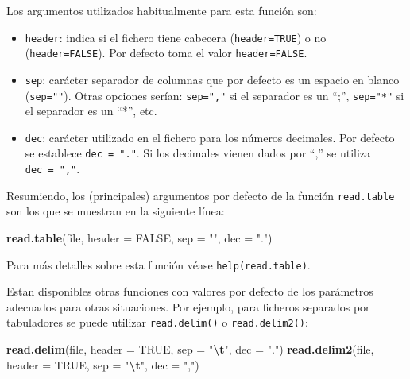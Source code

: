 \documentclass[
]{book}
\newenvironment{Shaded}{\begin{snugshade}}{\end{snugshade}}
\newcommand{\AttributeTok}[1]{\textcolor[rgb]{0.13,0.29,0.53}{#1}}
\newcommand{\ConstantTok}[1]{\textcolor[rgb]{0.56,0.35,0.01}{#1}}
\newcommand{\FunctionTok}[1]{\textcolor[rgb]{0.13,0.29,0.53}{\textbf{#1}}}
\newcommand{\NormalTok}[1]{#1}
\newcommand{\SpecialCharTok}[1]{\textcolor[rgb]{0.81,0.36,0.00}{\textbf{#1}}}
\newcommand{\StringTok}[1]{\textcolor[rgb]{0.31,0.60,0.02}{#1}}
\begin{document}
Los argumentos utilizados habitualmente para esta función son:

\begin{itemize}
\item
  \texttt{header}: indica si el fichero tiene cabecera (\texttt{header=TRUE}) o no
  (\texttt{header=FALSE}). Por defecto toma el valor \texttt{header=FALSE}.
\item
  \texttt{sep}: carácter separador de columnas que por defecto es un espacio
  en blanco (\texttt{sep=""}). Otras opciones serían: \texttt{sep=","} si el separador es
  un ``;'', \texttt{sep="*"} si el separador es un ``*'', etc.
\item
  \texttt{dec}: carácter utilizado en el fichero para los números decimales.
  Por defecto se establece \texttt{dec\ =\ "."}. Si los decimales vienen dados
  por ``,'' se utiliza \texttt{dec\ =\ ","}.
\end{itemize}

Resumiendo, los (principales) argumentos por defecto de la función
\texttt{read.table} son los que se muestran en la siguiente línea:

\begin{Shaded}
\begin{Highlighting}[]
\FunctionTok{read.table}\NormalTok{(file, }\AttributeTok{header =} \ConstantTok{FALSE}\NormalTok{, }\AttributeTok{sep =} \StringTok{""}\NormalTok{, }\AttributeTok{dec =} \StringTok{"."}\NormalTok{)  }
\end{Highlighting}
\end{Shaded}

Para más detalles sobre esta función véase
\texttt{help(read.table)}.

Estan disponibles otras funciones con valores por defecto de los parámetros
adecuados para otras situaciones. Por ejemplo, para ficheros separados por tabuladores
se puede utilizar \texttt{read.delim()} o \texttt{read.delim2()}:

\begin{Shaded}
\begin{Highlighting}[]
\FunctionTok{read.delim}\NormalTok{(file, }\AttributeTok{header =} \ConstantTok{TRUE}\NormalTok{, }\AttributeTok{sep =} \StringTok{"}\SpecialCharTok{\textbackslash{}t}\StringTok{"}\NormalTok{, }\AttributeTok{dec =} \StringTok{"."}\NormalTok{)}
\FunctionTok{read.delim2}\NormalTok{(file, }\AttributeTok{header =} \ConstantTok{TRUE}\NormalTok{, }\AttributeTok{sep =} \StringTok{"}\SpecialCharTok{\textbackslash{}t}\StringTok{"}\NormalTok{, }\AttributeTok{dec =} \StringTok{","}\NormalTok{)}
\end{Highlighting}
\end{Shaded}
\end{document}
